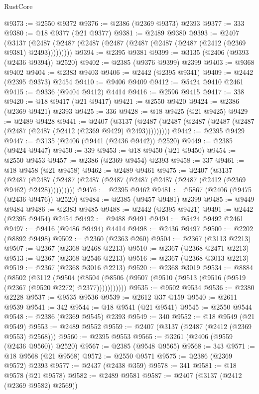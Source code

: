 \begin{lexlean}{RustCore}
\begin{coremodule}
@9373 := @2550 @9372
@9376 := @2386 (@2369 @9373) @2393
@9377 := 333
@9380 := @18 @9377 (@21 @9377)
@9381 := @2489 @9380
@9393 := @2407
    (@3137 (@2487 (@2487 (@2487 (@2487 (@2487 (@2487 (@2487 (@2412 (@2369 @9381) @2493)))))))))
@9394 := @2395 @9381
@9399 := @3135 (@2406 (@9393 (@2436 @9394)) @2520)
@9402 := @2385 (@9376 @9399) @2399
@9403 := @9368 @9402
@9404 := @2383 @9403
@9406 := @2442 (@2395 @9341)
@9409 := @2442 (@2395 @9373) @2454
@9410 := @9406 @9409
@9412 := @5424 @9410 @2461
@9415 := @9336 (@9404 @9412) @4414
@9416 := @2596 @9415
@9417 := 338
@9420 := @18 @9417 (@21 @9417)
@9421 := @2550 @9420
@9424 := @2386 (@2369 @9421) @2393
@9425 := 336
@9428 := @18 @9425 (@21 @9425)
@9429 := @2489 @9428
@9441 := @2407
    (@3137 (@2487 (@2487 (@2487 (@2487 (@2487 (@2487 (@2487 (@2412 (@2369 @9429) @2493)))))))))
@9442 := @2395 @9429
@9447 := @3135 (@2406 (@9441 (@2436 @9442)) @2520)
@9449 := @2385 (@9424 @9447)
@9450 := 339
@9453 := @18 @9450 (@21 @9450)
@9454 := @2550 @9453
@9457 := @2386 (@2369 @9454) @2393
@9458 := 337
@9461 := @18 @9458 (@21 @9458)
@9462 := @2489 @9461
@9475 := @2407
    (@3137
      (@2487 (@2487 (@2487 (@2487 (@2487 (@2487 (@2487 (@2487 (@2412 (@2369 @9462) @2428))))))))))
@9476 := @2395 @9462
@9481 := @5867 (@2406 (@9475 (@2436 @9476)) @2520)
@9484 := @2385 (@9457 @9481) @2399
@9485 := @9449 @9484
@9486 := @2383 @9485
@9488 := @2442 (@2395 @9421)
@9491 := @2442 (@2395 @9454) @2454
@9492 := @9488 @9491
@9494 := @5424 @9492 @2461
@9497 := @9416 (@9486 @9494) @4414
@9498 := @2436 @9497
@9500 := @2202 (@8892 @9498)
@9502 := @2360 (@2363 @260)
@9504 := @2367 (@3113 @2213)
@9507 := @2367 (@2368 @2468 @2213)
@9510 := @2367 (@2368 @2471 @2213)
@9513 := @2367 (@2368 @2546 @2213)
@9516 := @2367 (@2368 @3013 @2213)
@9519 := @2367 (@2368 @3016 @2213)
@9520 := @2368 @3019
@9534 := @8884
    (@8502
      (@3112
        (@9504
          (@8504 (@8506 (@9507 (@9510 (@9513 (@9516 (@9519 (@2367 (@9520 @2272) @2377)))))))))))
@9535 := @9502 @9534
@9536 := @2380 @2228
@9537 := @9535 @9536
@9539 := @2612 @37 @159
@9540 := @2611 @9539
@9541 := 342
@9544 := @18 @9541 (@21 @9541)
@9545 := @2550 @9544
@9548 := @2386 (@2369 @9545) @2393
@9549 := 340
@9552 := @18 @9549 (@21 @9549)
@9553 := @2489 @9552
@9559 := @2407 (@3137 (@2487 (@2412 (@2369 @9553) @2568)))
@9560 := @2395 @9553
@9565 := @3261 (@2406 (@9559 (@2436 @9560)) @2520)
@9567 := @2385 (@9548 @9565)
@9568 := 343
@9571 := @18 @9568 (@21 @9568)
@9572 := @2550 @9571
@9575 := @2386 (@2369 @9572) @2393
@9577 := @2437 (@2438 @359)
@9578 := 341
@9581 := @18 @9578 (@21 @9578)
@9582 := @2489 @9581
@9587 := @2407 (@3137 (@2412 (@2369 @9582) @2569))

\end{coremodule}
\end{lexlean}
